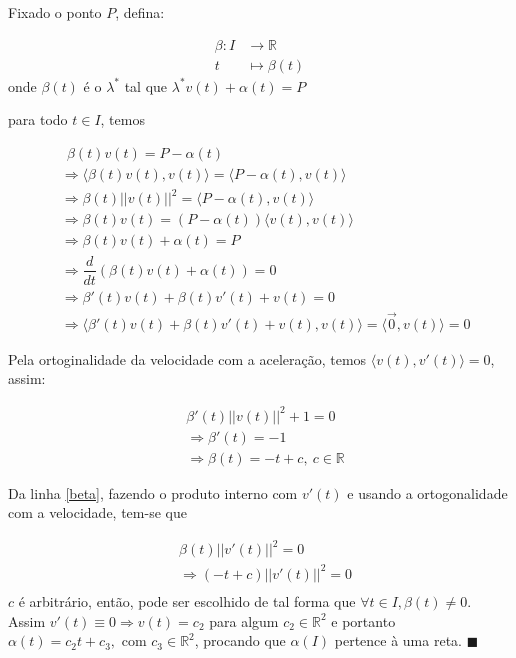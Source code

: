\documentclass[12pt,letterpaper]{article}
\begin{document}
\begin{enumerate}
	
	Fixado o ponto $P$, defina:
	
	\begin{align*}
		\beta:I&\to\mathbb{R}\\
		t&\mapsto \beta(t)
	\end{align*} 
	onde $\beta(t)$ é o $\lambda^*$ tal que $\lambda^*v(t)+\alpha(t)=P$
	
	para todo $t\in I$, temos
	
	\begin{align}
		&~~\beta(t)v(t)=P-\alpha(t)\nonumber\\
		&\Rightarrow \langle\beta(t)v(t),v(t)\rangle=\langle P-\alpha(t),v(t)\rangle\nonumber\\
		&\Rightarrow\beta(t)||v(t)||^2=\langle P-\alpha(t),v(t)\rangle\nonumber\\
		&\Rightarrow\beta(t)v(t)=(P-\alpha(t))\langle v(t),v(t)\rangle\nonumber\\
		&\Rightarrow\beta(t)v(t)+\alpha(t)=P\nonumber\\
		&\Rightarrow\dfrac{d}{dt}(\beta(t)v(t)+\alpha(t))=0\nonumber\\
		&\Rightarrow\beta'(t)v(t)+\beta(t)v'(t)+v(t)=0\label{beta}\\
		&\Rightarrow\langle\beta'(t)v(t)+\beta(t)v'(t)+v(t),v(t)\rangle=\langle\vec 0,v(t)\rangle=0\nonumber
	\end{align}

	Pela ortoginalidade da velocidade com a aceleração, temos $\langle v(t),v'(t)\rangle=0$, assim:
	
	\begin{align*}
		&\beta'(t)||v(t)||^2+1=0\\&
		\Rightarrow \beta'(t)=-1\\&\Rightarrow
		\beta(t)=-t+c,~c\in\mathbb{R}
	\end{align*}
	
	Da linha \ref{beta}, fazendo o produto interno com $v'(t)$ e usando a ortogonalidade com a velocidade, tem-se que 
	
	\begin{align*}
		&\beta(t)||v'(t)||^2=0\\
		&\Rightarrow(-t+c)||v'(t)||^2=0\\
	\end{align*}
	$c$ é arbitrário, então, pode ser escolhido de tal forma que $\forall t\in I,\beta(t)\neq0$. Assim $v'(t)\equiv0\Rightarrow v(t)=c_2$ para algum $c_2\in\mathbb{R}^2$ e portanto $\alpha(t)=c_2t+c_3,\text{ com }c_3\in\mathbb{R}^2$, procando que $\alpha(I)$ pertence à uma reta. $\blacksquare$
	

\end{enumerate}
\end{document}
